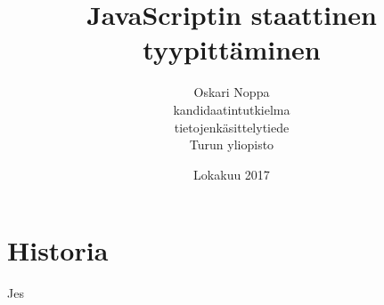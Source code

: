 \documentclass[a4paper, 12pt]{article}
\title{JavaScriptin staattinen tyypittäminen}
\author{Oskari Noppa \\kandidaatintutkielma \\ tietojenkäsittelytiede \\ Turun yliopisto}
\date{Lokakuu 2017}
\begin{document}
  \section{Historia}
  Jes
\end{document}
